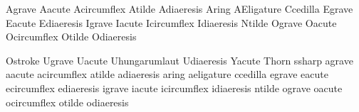 


\startencoding[uc]

 Agrave        {}
 Aacute        {}
 Acircumflex   {}
 Atilde        {}
 Adiaeresis    {}
 Aring         {}
 AEligature    {}
 Ccedilla      {}
 Egrave        {}
 Eacute        {}
 Ediaeresis    {}
 Igrave        {}
 Iacute        {}
 Icircumflex   {}
 Idiaeresis    {}
 Ntilde        {}
 Ograve        {}
 Oacute        {}
 Ocircumflex   {}
 Otilde        {}
 Odiaeresis    {}

 Ostroke       {}
 Ugrave        {}
 Uacute        {}
 Uhungarumlaut {}
 Udiaeresis    {}
 Yacute        {}
 Thorn         {}
 ssharp        {}
 agrave        {}
 aacute        {}
 acircumflex   {}
 atilde        {}
 adiaeresis    {}
 aring         {}
 aeligature    {}
 ccedilla      {}
 egrave        {}
 eacute        {}
 ecircumflex   {}
 ediaeresis    {}
 igrave        {}
 iacute        {}
 icircumflex   {}
 idiaeresis    {}
 ntilde        {}
 ograve        {}
 oacute        {}
 ocircumflex   {}
 otilde        {}
 odiaeresis    {}

